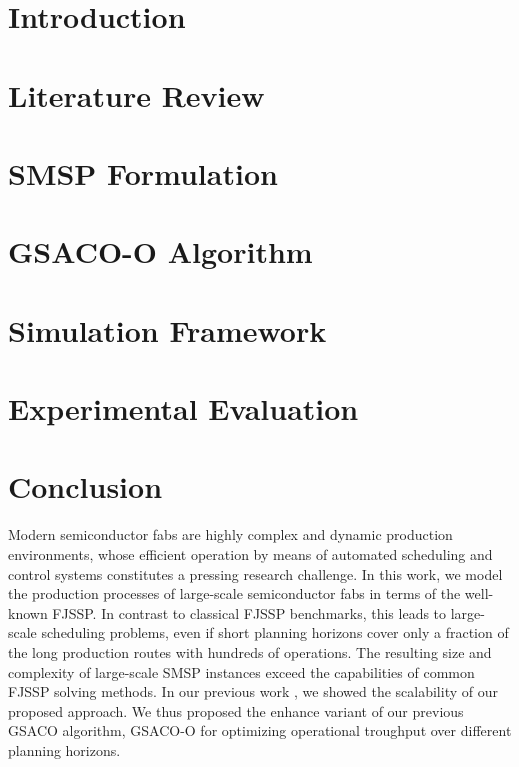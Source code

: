 \documentclass[runningheads]{llncs}
\begin{document}
\section{Introduction}
\label{sec:introduction}


\section{Literature Review}
\label{sec:lit_rev}


\section{SMSP Formulation}
\label{sec:problem_f}


\section{GSACO-O Algorithm}
\label{sec:gsaco}


\section{Simulation Framework}
\label{sec:sim}


\section{Experimental Evaluation}
\label{sec:results}



\section{Conclusion}
\label{sec:conclusion}

Modern semiconductor fabs are highly complex and dynamic production
environments, whose efficient operation by means of automated scheduling
and control systems constitutes a pressing research challenge.
In this work, we model the production processes of large-scale
semiconductor fabs in terms of the well-known FJSSP.
In contrast to classical FJSSP benchmarks,
this leads to large-scale scheduling problems,
even if short planning horizons cover only a fraction of the long
production routes with hundreds of operations.
The resulting size and complexity of large-scale SMSP instances
exceed the capabilities of common FJSSP solving methods.
In our previous work \cite{Ali2024}, we showed the scalability of our proposed approach. 
We thus proposed the enhance variant of our previous GSACO algorithm, GSACO-O for optimizing operational troughput over different planning horizons.
\end{document}
